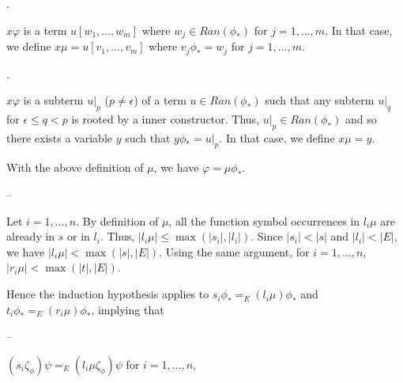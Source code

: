 \documentclass[10pt,a4paper]{amsart}
\begin{document}
 
  
\par{}. 
 
$x\varphi$ is a term $u[w_{1},\dots,w_{m}]$ where $w_{j}\in Ran(\phi_{*})$ for $j=1,\dots,m$. In that case, we define $x\mu=u[v_{1},\dots,v_{m}]$ where $v_{j}\phi_{*}=w_{j}$ for $j=1,\dots,m$.\par
 
 
 
\par{}. 
 
$x\varphi$ is a subterm $u|_{p}$ ($p\neq\epsilon$) of a term $u\in Ran(\phi_{*})$ such that any subterm $u|_{q}$ for $\epsilon\leq q<p$ is rooted by a inner constructor. Thus, $u|_{p}\in Ran(\phi_{*})$ and so there exists a variable $y$ such that $y\phi_{*}=u|_{p}$. In that case, we define $x\mu=y$.\par
 
 
  
With the above definition of $\mu$, we have $\varphi=\mu\phi_{*}$.\par
 
 
 
\par\noindent  – 
 
Let $i=1,\dots,n$. By definition of $\mu$, all the function symbol occurrences in $l_{i}\mu$ are already in $s$ or in $l_{i}$. Thus, $|l_{i}\mu|\leq\max(|s_{i}|,|l_{i}|)$. Since $|s_{i}|<|s|$ and $|l_{i}|<|E|$, we have $|l_{i}\mu|<\max(|s|,|E|)$. Using the same argument, for $i=1,\dots,n$, $|r_{i}\mu|<\max(|t|,|E|)$.\par
 
 
  
Hence the induction hypothesis applies to $s_{i}\phi_{*}=_{E}(l_{i}\mu)\phi_{*}$ and $t_{i}\phi_{*}=_{E}(r_{i}\mu)\phi_{*}$, implying that\par
  
\par\noindent  – 
 
$(s_{i}\zeta_{\phi})\psi=_{E}(l_{i}\mu\zeta_{\phi})\psi$ for $i=1,\dots,n$,\par
 
 
\end{document}
